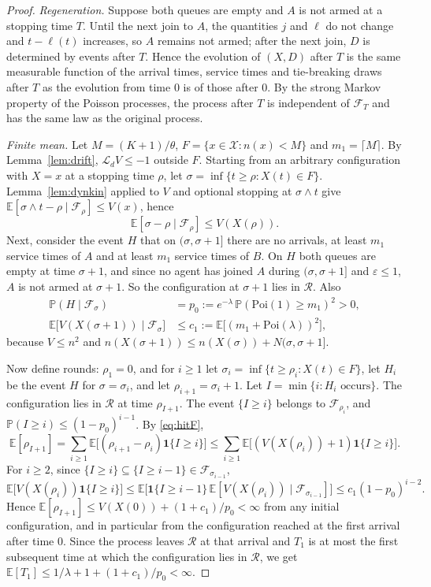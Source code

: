 \documentclass[11pt]{article}
\theoremstyle{definition}
\theoremstyle{remark}
\newcommand{\E}{\mathbb{E}}
\renewcommand{\Pr}{\mathbb{P}}
\newcommand{\ind}{\mathbf{1}}
\newcommand{\cX}{\mathcal{X}}
\newcommand{\cF}{\mathcal{F}}
\newcommand{\cL}{\mathcal{L}}
\newcommand{\Poi}{\mathrm{Poi}}
\begin{document}
\begin{proof}
\emph{Regeneration.} Suppose both queues are empty and $A$ is not armed at a
stopping time $T$. Until the next join to $A$, the quantities $j$ and $\ell$
do not change and $t-\ell(t)$ increases, so $A$ remains not armed; after the
next join, $D$ is determined by events after $T$. Hence the evolution of
$(X,D)$ after $T$ is the same measurable function of the arrival times, service
times and tie-breaking draws after $T$ as the evolution from time $0$ is of
those after $0$. By the strong Markov property of the Poisson processes, the
process after $T$ is independent of $\cF_T$ and has the same law as the
original process.

\emph{Finite mean.} Let $M=(K+1)/\theta$, $F=\{x\in\cX:n(x)<M\}$ and
$m_1=\lceil M\rceil$. By Lemma~\ref{lem:drift}, $\cL_dV\le-1$ outside $F$.
Starting from an arbitrary configuration with $X=x$ at a stopping time $\rho$,
let $\sigma=\inf\{t\ge\rho:X(t)\in F\}$. Lemma~\ref{lem:dynkin} applied to $V$
and optional stopping at $\sigma\wedge t$ give
$\E[\sigma\wedge t-\rho\mid\cF_\rho]\le V(x)$, hence
\begin{equation}\label{eq:hitF}
  \E[\sigma-\rho\mid\cF_\rho]\le V(X(\rho)).
\end{equation}
Next, consider the event $H$ that on $(\sigma,\sigma+1]$ there are no
arrivals, at least $m_1$ service times of $A$ and at least $m_1$ service times
of $B$. On $H$ both queues are empty at time $\sigma+1$, and since no agent has
joined $A$ during $(\sigma,\sigma+1]$ and $\varepsilon\le1$, $A$ is not armed
at $\sigma+1$. So the configuration at $\sigma+1$ lies in $\mathcal{R}$. Also
\begin{align*}
  \Pr(H\mid\cF_\sigma)&=p_0:=e^{-\lambda}\,\Pr(\Poi(1)\ge m_1)^2>0,\\
  \E\bigl[V(X(\sigma+1))\mid\cF_\sigma\bigr]&\le c_1:=\E\bigl[(m_1+\Poi(\lambda))^2\bigr],
\end{align*}
because $V\le n^2$ and $n(X(\sigma+1))\le n(X(\sigma))+N(\sigma,\sigma+1]$.

Now define rounds: $\rho_1=0$, and for $i\ge1$ let
$\sigma_i=\inf\{t\ge\rho_i:X(t)\in F\}$, let $H_i$ be the event $H$ for
$\sigma=\sigma_i$, and let $\rho_{i+1}=\sigma_i+1$. Let
$I=\min\{i:H_i\text{ occurs}\}$. The configuration lies in $\mathcal{R}$ at
time $\rho_{I+1}$. The event $\{I\ge i\}$ belongs to $\cF_{\rho_i}$, and
$\Pr(I\ge i)\le(1-p_0)^{i-1}$. By \eqref{eq:hitF},
\[
  \E[\rho_{I+1}]=\sum_{i\ge1}\E\bigl[(\rho_{i+1}-\rho_i)\ind\{I\ge i\}\bigr]
  \le\sum_{i\ge1}\E\bigl[(V(X(\rho_i))+1)\ind\{I\ge i\}\bigr].
\]
For $i\ge2$, since $\{I\ge i\}\subseteq\{I\ge i-1\}\in\cF_{\sigma_{i-1}}$,
\[
  \E\bigl[V(X(\rho_i))\ind\{I\ge i\}\bigr]
  \le\E\bigl[\ind\{I\ge i-1\}\,\E[V(X(\rho_i))\mid\cF_{\sigma_{i-1}}]\bigr]
  \le c_1(1-p_0)^{i-2}.
\]
Hence $\E[\rho_{I+1}]\le V(X(0))+(1+c_1)/p_0<\infty$ from any initial
configuration, and in particular from the configuration reached at the first
arrival after time $0$. Since the process leaves $\mathcal{R}$ at that arrival
and $T_1$ is at most the first subsequent time at which the configuration lies
in $\mathcal{R}$, we get $\E[T_1]\le1/\lambda+1+(1+c_1)/p_0<\infty$.
\end{proof}
\end{document}
